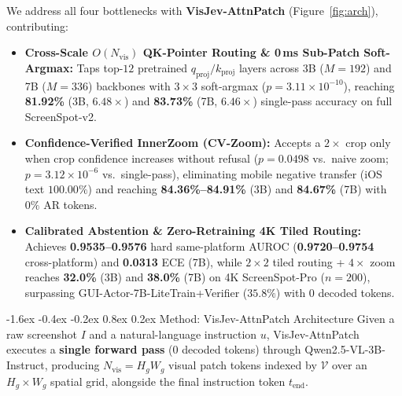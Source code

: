 \documentclass[10pt,twocolumn,letterpaper]{article}
\makeatletter
\renewcommand\section{\@startsection{section}{1}{\z@}%
  {-1.6ex \@plus -0.4ex \@minus -0.2ex}%
  {0.8ex \@plus 0.2ex}%
  {\normalfont\large\bfseries\color{navy}}}
\makeatother
\begin{document}
We address all four bottlenecks with \textbf{VisJev-AttnPatch} (Figure~\ref{fig:arch}), contributing:
\begin{itemize}
  \setlength{\itemsep}{2pt}\setlength{\parskip}{0pt}
  \item \textbf{Cross-Scale $O(N_{\mathrm{vis}})$ QK-Pointer Routing \& 0\,ms Sub-Patch Soft-Argmax:} Taps top-$12$ pretrained $q_{\mathrm{proj}}/k_{\mathrm{proj}}$ layers across 3B ($M{=}192$) and 7B ($M{=}336$) backbones with $3{\times}3$ soft-argmax ($p{=}3.11{\times}10^{-10}$), reaching \textbf{81.92\%} (3B, $6.48\times$) and \textbf{83.73\%} (7B, $6.46\times$) single-pass accuracy on full ScreenSpot-v2.
  \item \textbf{Confidence-Verified InnerZoom (CV-Zoom):} Accepts a $2{\times}$ crop only when crop confidence increases without refusal ($p{=}0.0498$ vs.\ naive zoom; $p{=}3.12{\times}10^{-6}$ vs.\ single-pass), eliminating mobile negative transfer (iOS text $\mathbf{100.00\%}$) and reaching \textbf{84.36\%--84.91\%} (3B) and \textbf{84.67\%} (7B) with $0\%$ AR tokens.
  \item \textbf{Calibrated Abstention \& Zero-Retraining 4K Tiled Routing:} Achieves \textbf{0.9535--0.9576} hard same-platform AUROC (\textbf{0.9720--0.9754} cross-platform) and \textbf{0.0313} ECE (7B), while $2{\times}2$ tiled routing + $4{\times}$ zoom reaches \textbf{32.0\%} (3B) and \textbf{38.0\%} (7B) on 4K ScreenSpot-Pro ($n{=}200$), surpassing GUI-Actor-7B-LiteTrain+Verifier ($35.8\%$) with $0$ decoded tokens.
\end{itemize}

\section{Method: VisJev-AttnPatch Architecture}
\label{sec:method}
Given a raw screenshot $I$ and a natural-language instruction $u$, VisJev-AttnPatch executes a \textbf{single forward pass} ($0$ decoded tokens) through Qwen2.5-VL-3B-Instruct, producing $N_{\mathrm{vis}} = H_g W_g$ visual patch tokens indexed by $\mathcal{V}$ over an $H_g \times W_g$ spatial grid, alongside the final instruction token $t_{\mathrm{end}}$.
\end{document}
